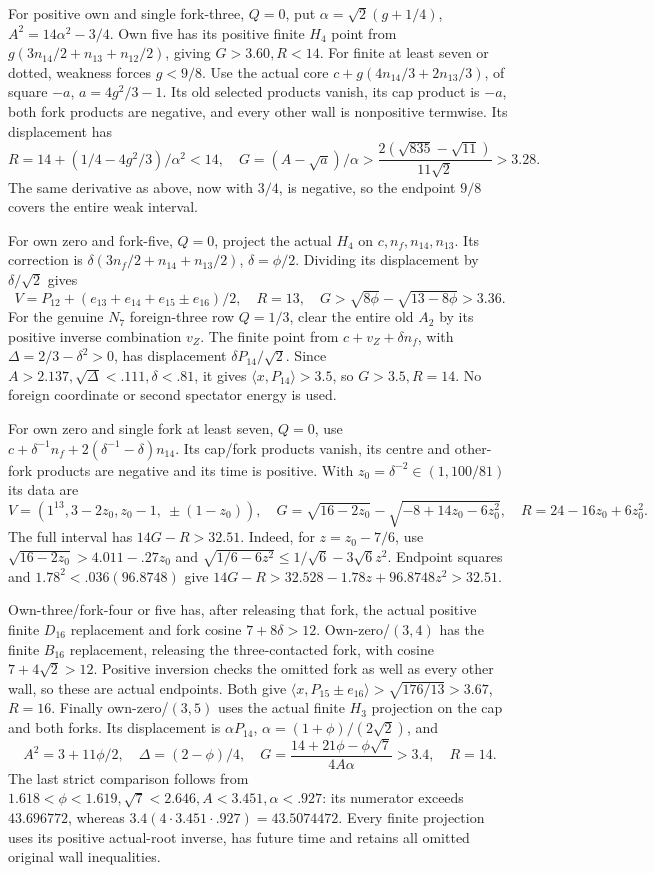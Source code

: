 \documentclass[11pt]{article}
\theoremstyle{definition}
\theoremstyle{remark}
\newcommand{\ip}[2]{\langle #1,#2\rangle}
\begin{document}
For positive own and single fork-three, \(Q=0\), put
\(\alpha=\sqrt2(g+1/4)\), \(A^2=14\alpha^2-3/4\).
Own five has its positive finite \(H_4\) point from
\(g(3n_{14}/2+n_{13}+n_{12}/2)\), giving \(G>3.60,R<14\).
For finite at least seven or dotted, weakness forces \(g<9/8\).
Use the actual core \(c+g(4n_{14}/3+2n_{13}/3)\), of square
\(-a\), \(a=4g^2/3-1\). Its old selected products vanish,
its cap product is \(-a\), both fork products are negative,
and every other wall is nonpositive termwise. Its displacement
has
\[
 R=14+(1/4-4g^2/3)/\alpha^2<14,\quad
 G=(A-\sqrt a)/\alpha>
 {\frac{2(\sqrt{835}-\sqrt{11})}{11\sqrt2}}>3.28.
\]
The same derivative as above, now with \(3/4\), is negative,
so the endpoint \(9/8\) covers the entire weak interval.

For own zero and fork-five, \(Q=0\), project the actual \(H_4\)
on \(c,n_f,n_{14},n_{13}\). Its correction is
\(\delta(3n_f/2+n_{14}+n_{13}/2)\), \(\delta=\phi/2\).
Dividing its displacement by \(\delta/\sqrt2\) gives
\[
 V=P_{12}+(e_{13}+e_{14}+e_{15}\pm e_{16})/2,\quad
 R=13,\quad G>\sqrt{8\phi}-\sqrt{13-8\phi}>3.36.
\]
For the genuine \(N_7\) foreign-three row \(Q=1/3\), clear
the entire old \(A_2\) by its positive inverse combination \(v_Z\).
The finite point from \(c+v_Z+\delta n_f\), with
\(\Delta=2/3-\delta^2>0\), has displacement
\(\delta P_{14}/\sqrt2\). Since
\(A>2.137,\sqrt\Delta<.111,\delta<.81\), it gives
\(\ip x{P_{14}}>3.5\), so \(G>3.5,R=14\).
No foreign coordinate or second spectator energy is used.

For own zero and single fork at least seven, \(Q=0\), use
\(c+\delta^{-1}n_f+2(\delta^{-1}-\delta)n_{14}\).
Its cap/fork products vanish, its centre and other-fork products
are negative and its time is positive. With
\(z_0=\delta^{-2}\in(1,100/81)\) its data are
\[
 V=(1^{13},3-2z_0,z_0-1,\ \pm(1-z_0)),\quad
 G=\sqrt{16-2z_0}-\sqrt{-8+14z_0-6z_0^2},\quad
 R=24-16z_0+6z_0^2.
\]
The full interval has \(14G-R>32.51\). Indeed, for
\(z=z_0-7/6\), use
\(\sqrt{16-2z_0}>4.011-.27z_0\) and
\(\sqrt{1/6-6z^2}\le1/\sqrt6-3\sqrt6z^2\).
Endpoint squares and \(1.78^2<.036(96.8748)\) give
\(14G-R>32.528-1.78z+96.8748z^2>32.51\).

Own-three/fork-four or five has, after releasing that fork,
the actual positive finite \(D_{16}\) replacement and fork
cosine \(7+8\delta>12\). Own-zero/\((3,4)\) has the finite
\(B_{16}\) replacement, releasing the three-contacted fork,
with cosine \(7+4\sqrt2>12\). Positive inversion checks the
omitted fork as well as every other wall, so these are actual
endpoints. Both give
\(\ip x{P_{15}\pm e_{16}}>\sqrt{176/13}>3.67\), \(R=16\).
Finally own-zero/\((3,5)\) uses the actual finite \(H_3\)
projection on the cap and both forks. Its displacement is
\(\alpha P_{14}\), \(\alpha=(1+\phi)/(2\sqrt2)\), and
\[
 A^2=3+11\phi/2,\quad \Delta=(2-\phi)/4,\quad
 G={\frac{14+21\phi-\phi\sqrt7}{4A\alpha}}>3.4,\quad R=14.
\]
The last strict comparison follows from
\(1.618<\phi<1.619,\sqrt7<2.646,A<3.451,\alpha<.927\):
its numerator exceeds \(43.696772\), whereas
\(3.4(4\cdot3.451\cdot.927)=43.5074472\).
Every finite projection uses its positive actual-root inverse,
has future time and retains all omitted original wall inequalities.
\end{document}
